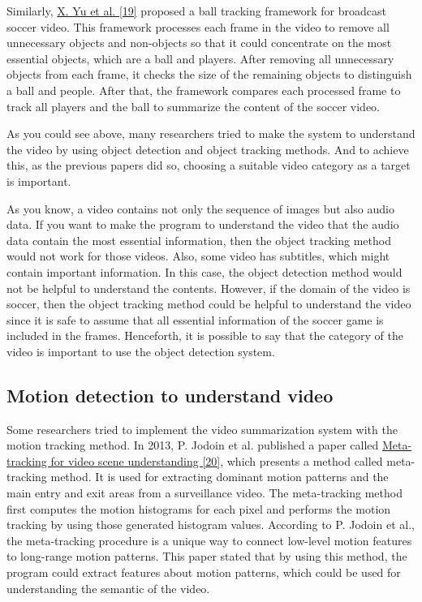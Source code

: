 \documentclass{article}
\begin{document}
Similarly, \hyperlink{ref19}{X. Yu et al. [19]} proposed a ball tracking framework for broadcast soccer video. This framework processes each frame in the video to remove all unnecessary objects and non-objects so that it could concentrate on the most essential objects, which are a ball and players. After removing all unnecessary objects from each frame, it checks the size of the remaining objects to distinguish a ball and people. After that, the framework compares each processed frame to track all players and the ball to summarize the content of the soccer video.

As you could see above, many researchers tried to make the system to understand the video by using object detection and object tracking methods. And to achieve this, as the previous papers did so, choosing a suitable video category as a target is important.

As you know, a video contains not only the sequence of images but also audio data. If you want to make the program to understand the video that the audio data contain the most essential information, then the object tracking method would not work for those videos. Also, some video has subtitles, which might contain important information. In this case, the object detection method would not be helpful to understand the contents. However, if the domain of the video is soccer, then the object tracking method could be helpful to understand the video since it is safe to assume that all essential information of the soccer game is included in the frames. Henceforth, it is possible to say that the category of the video is important to use the object detection system.

\subsection{Motion detection to understand video}

Some researchers tried to implement the video summarization system with the motion tracking method. In 2013, P. Jodoin et al. published a paper called \hyperlink{ref20}{Meta-tracking for video scene understanding [20]}, which presents a method called meta-tracking method. It is used for extracting dominant motion patterns and the main entry and exit areas from a surveillance video. The meta-tracking method first computes the motion histograms for each pixel and performs the motion tracking by using those generated histogram values. According to P. Jodoin et al., the meta-tracking procedure is a unique way to connect low-level motion features to long-range motion patterns. This paper stated that by using this method, the program could extract features about motion patterns, which could be used for understanding the semantic of the video.
\end{document}
